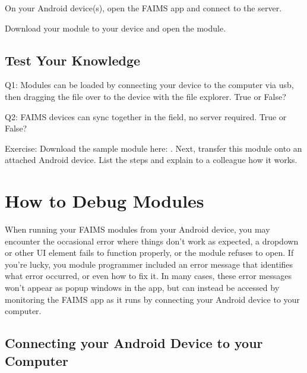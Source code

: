 On your Android device(s), open the FAIMS app and connect to the server.

Download your module to your device and open the module.

\subsection[test-your-knowledge-2]{Test Your Knowledge}

Q1: Modules can be loaded by connecting your device to the computer via usb, then dragging the file over to the device with the file explorer. True or False?

Q2: FAIMS devices can sync together in the field, no server required. True or False?

Exercise: Download the sample module here: \from[url26]. Next, transfer this module onto an attached Android device. List the steps and explain to a colleague how it works.

\section[section-7]{}

\section[section-8]{\crlf
}

\section[how-to-debug-modules]{How to Debug Modules}

When running your FAIMS modules from your Android device, you may encounter the occasional error where things don't work as expected, a dropdown or other UI element fails to function properly, or the module refuses to open. If you're lucky, you module programmer included an error message that identifies what error occurred, or even how to fix it. In many cases, these error messages won't appear as popup windows in the app, but can instead be accessed by monitoring the FAIMS app as it runs by connecting your Android device to your computer.

\subsection[connecting-your-android-device-to-your-computer]{Connecting your Android Device to your Computer}

